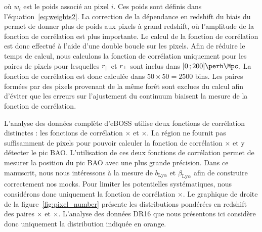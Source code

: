\documentclass[11pt, twoside, a4paper, openright]{report}
\begin{document}
où $w_i$ est le poids associé au pixel $i$. Ces poids sont définis dans l'équation~\ref{eq:weights2}. La correction de la dépendance en redshift du biais du \lya{} permet de donner plus de poids aux pixels à grand redshift, où l'amplitude de la fonction de corrélation est plus importante.
Le calcul de la fonction de corrélation est donc effectué à l'aide d'une double boucle sur les pixels.
Afin de réduire le temps de calcul, nous calculons la fonction de corrélation uniquement pour les paires de pixels pour lesquelles $r_{\parallel}{}$ et $r_{\perp}{}$ sont inclus dans $[0 \, ; 200] \si{\perh\Mpc}$. La fonction de corrélation est donc calculée dans $50 \times 50 = \num{2500}$ bins.
Les paires formées par des pixels provenant de la même forêt sont exclues du calcul afin d'éviter que les erreurs sur l'ajustement du continuum biaisent la mesure de la fonction de corrélation.

L'analyse \lya{} des données complète d'eBOSS \citep{prov} utilise deux fonctions de corrélation distinctes : les fonctions de corrélation \lyalya{}$\times$\lyalya{} et \lyalya{}$\times$\lyalyb{}. La région \lyb{} ne fournit pas suffisamment de pixels pour pouvoir calculer la fonction de corrélation \lyalyb{}$\times$\lyalyb{} et y détecter le pic BAO. L'utilisation de ces deux fonctions de corrélation permet de mesurer la position du pic BAO avec une plus grande précision. Dans ce manuscrit, nous nous intéressons à la mesure de $b_{\mathrm{Ly}\alpha}$ et $\beta_{\mathrm{Ly}\alpha}$ afin de construire correctement nos mocks. Pour limiter les potentielles systématiques, nous considérons donc uniquement la fonction de corrélation \lyalya{}$\times$\lyalya{}.
Le graphique de droite de la figure~\ref{fig:pixel_number} présente les distributions pondérées en redshift des paires \lyalya{}$\times$\lyalya{} et \lyalya{}$\times$\lyalyb{}. L'analyse des données DR16 que nous présentons ici considère donc uniquement la distribution indiquée en orange.
\end{document}
